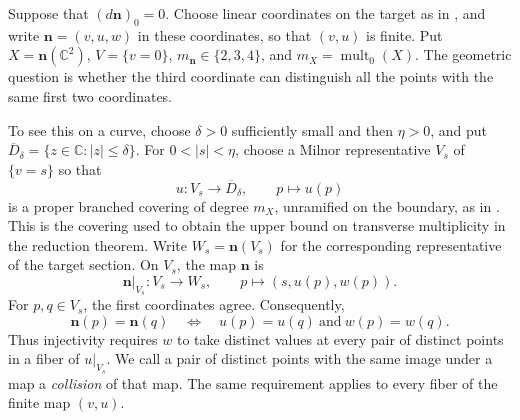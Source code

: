 \documentclass[11pt,letterpaper]{article}
\numberwithin{equation}{section}
\theoremstyle{remark}
\theoremstyle{plain}
\newcommand{\C}{\mathbb{C}}
\newcommand{\mult}{\operatorname{mult}}
\begin{document}
Suppose that $(d\boldsymbol n)_0=0$.  Choose linear coordinates on
the target as in , and write
$\boldsymbol n=(v,u,w)$ in these coordinates, so that $(v,u)$ is finite.
Put $X=\boldsymbol n(\C^2)$, $V=\{v=0\}$,
$m_{\boldsymbol n}\in\{2,3,4\}$, and $m_X=\mult_0(X)$.
The geometric question is whether the third coordinate can distinguish
all the points with the same first two coordinates.

To see this on a curve, choose $\delta>0$ sufficiently small and then
$\eta>0$, and put $\overline D_\delta=\{z\in\C:|z|\leq\delta\}$.
For $0<|s|<\eta$, choose a Milnor representative
$V_s$ of $\{v=s\}$ so that
\[
 u:V_s\longrightarrow\overline D_\delta,\qquad p\longmapsto u(p)
\]
is a proper branched covering of degree $m_X$, unramified on the
boundary, as in \cite[proof of Proposition~2.16]{PortillaReduction}.
This is the covering used to obtain the upper bound on transverse
multiplicity in the reduction theorem.  Write $W_s=\boldsymbol n(V_s)$
for the corresponding representative of the target section.  On $V_s$,
the map $\boldsymbol n$ is
\[
 \boldsymbol n|_{V_s}:V_s\longrightarrow W_s,\qquad
 p\longmapsto(s,u(p),w(p)).
\]
For $p,q\in V_s$, the first coordinates agree.  Consequently,
\begin{equation}
 \boldsymbol n(p)=\boldsymbol n(q)
 \quad\Longleftrightarrow\quad
 u(p)=u(q)\ \text{and}\ w(p)=w(q).
 \label{eq:strategy-separation}
\end{equation}
Thus injectivity requires $w$ to take distinct values at every pair of
distinct points in a fiber of $u|_{V_s}$.
We call a pair of distinct points with the same image under a map
a \emph{collision} of that map.
The same requirement applies to every fiber of the finite map $(v,u)$.
\end{document}
